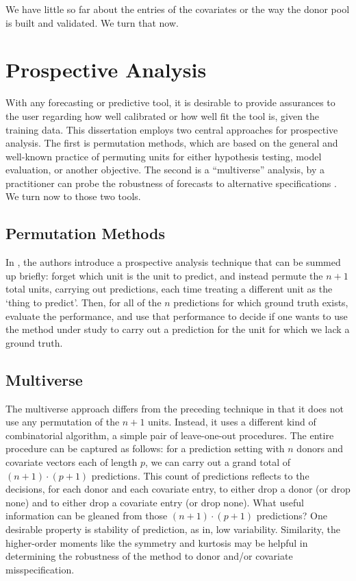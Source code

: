 \documentclass{uiucthesis2021}
\theoremstyle{definition}
\begin{document}
We have little so far about the entries of the covariates or the way the donor pool is built and validated.  We turn that now.

\section{Prospective Analysis}
With any forecasting or predictive tool, it is desirable to provide assurances to the user regarding how well calibrated or how well fit the tool is, given the training data.  This dissertation employs two central approaches for prospective analysis.  The first is permutation methods, which are based on the general and well-known practice of permuting units for either hypothesis testing, model evaluation, or another objective.  The second is a ``multiverse'' analysis, by a practitioner can probe the robustness of forecasts to alternative specifications \cite[][]{steegen2016increasing}.  We turn now to those two tools.
\subsection{Permutation Methods}

In \cite[][]{lin2021minimizing}, the authors introduce a prospective analysis technique that can be summed up briefly: forget which unit is the unit to predict, and instead permute the $n+1$ total units, carrying out predictions, each time treating a different unit as the `thing to predict'.  Then, for all of the $n$ predictions for which ground truth exists, evaluate the performance, and use that performance to decide if one wants to use the method under study to carry out a prediction for the unit for which we lack a ground truth.

\subsection{Multiverse}
The multiverse approach differs from the preceding technique in that it does not use any permutation of the $n+1$ units.  Instead, it uses a different kind of combinatorial algorithm, a simple pair of leave-one-out procedures.  The entire procedure can be captured as follows: for a prediction setting with $n$ donors and covariate vectors each of length $p$, we can carry out a grand total of $(n+1)\cdot(p+1)$ predictions.  This count of predictions reflects to the decisions, for each donor and each covariate entry, to either drop a donor (or drop none) and to either drop a covariate entry (or drop none).  What useful information can be gleaned from those $(n+1)\cdot(p+1)$ predictions?  One desirable property is stability of prediction, as in, low variability.  Similarity, the higher-order moments like the symmetry and kurtosis may be helpful in determining the robustness of the method to donor and/or covariate misspecification.
\end{document}
